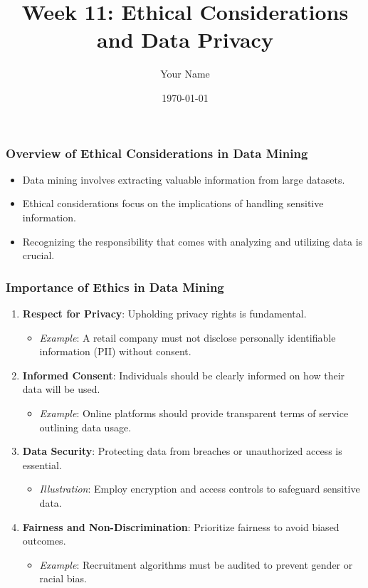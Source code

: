 \documentclass[aspectratio=169]{beamer}
\title[Week 11: Ethics and Privacy]{Week 11: Ethical Considerations and Data Privacy}
\author[Your Name]{Your Name}
\date{\today}
\begin{document}
\frame{\titlepage}

\begin{frame}[fragile]
    \titlepage
\end{frame}

\begin{frame}[fragile]
    \frametitle{Overview of Ethical Considerations in Data Mining}
    \begin{itemize}
        \item Data mining involves extracting valuable information from large datasets.
        \item Ethical considerations focus on the implications of handling sensitive information.
        \item Recognizing the responsibility that comes with analyzing and utilizing data is crucial.
    \end{itemize}
\end{frame}

\begin{frame}[fragile]
    \frametitle{Importance of Ethics in Data Mining}
    \begin{enumerate}
        \item \textbf{Respect for Privacy}: Upholding privacy rights is fundamental.
        \begin{itemize}
            \item \textit{Example}: A retail company must not disclose personally identifiable information (PII) without consent.
        \end{itemize}
        
        \item \textbf{Informed Consent}: Individuals should be clearly informed on how their data will be used.
        \begin{itemize}
            \item \textit{Example}: Online platforms should provide transparent terms of service outlining data usage.
        \end{itemize}

        \item \textbf{Data Security}: Protecting data from breaches or unauthorized access is essential.
        \begin{itemize}
            \item \textit{Illustration}: Employ encryption and access controls to safeguard sensitive data.
        \end{itemize}

        \item \textbf{Fairness and Non-Discrimination}: Prioritize fairness to avoid biased outcomes.
        \begin{itemize}
            \item \textit{Example}: Recruitment algorithms must be audited to prevent gender or racial bias.
        \end{itemize}
    \end{enumerate}
\end{frame}
\end{document}
